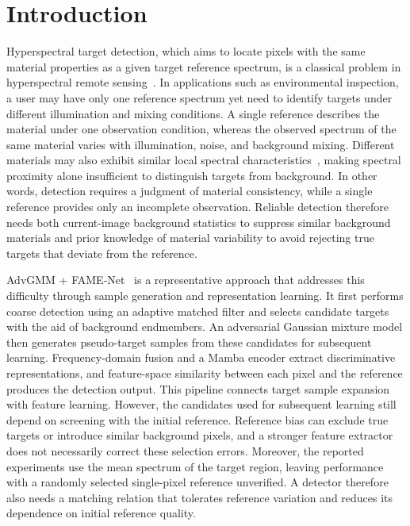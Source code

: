 \documentclass[a4paper,11pt]{article}
\begin{document}
\section{Introduction}
Hyperspectral target detection, which aims to locate pixels with the same material properties as a given target reference spectrum, is a classical problem in hyperspectral remote sensing~\cite{mlsn,htdmamba}. In applications such as environmental inspection, a user may have only one reference spectrum yet need to identify targets under different illumination and mixing conditions. A single reference describes the material under one observation condition, whereas the observed spectrum of the same material varies with illumination, noise, and background mixing. Different materials may also exhibit similar local spectral characteristics~\cite{pstd,tasr}, making spectral proximity alone insufficient to distinguish targets from background. In other words, detection requires a judgment of material consistency, while a single reference provides only an incomplete observation. Reliable detection therefore needs both current-image background statistics to suppress similar background materials and prior knowledge of material variability to avoid rejecting true targets that deviate from the reference.

AdvGMM + FAME-Net~\cite{fame} is a representative approach that addresses this difficulty through sample generation and representation learning. It first performs coarse detection using an adaptive matched filter and selects candidate targets with the aid of background endmembers. An adversarial Gaussian mixture model then generates pseudo-target samples from these candidates for subsequent learning. Frequency-domain fusion and a Mamba encoder extract discriminative representations, and feature-space similarity between each pixel and the reference produces the detection output. This pipeline connects target sample expansion with feature learning. However, the candidates used for subsequent learning still depend on screening with the initial reference. Reference bias can exclude true targets or introduce similar background pixels, and a stronger feature extractor does not necessarily correct these selection errors. Moreover, the reported experiments use the mean spectrum of the target region, leaving performance with a randomly selected single-pixel reference unverified. A detector therefore also needs a matching relation that tolerates reference variation and reduces its dependence on initial reference quality.
\end{document}

